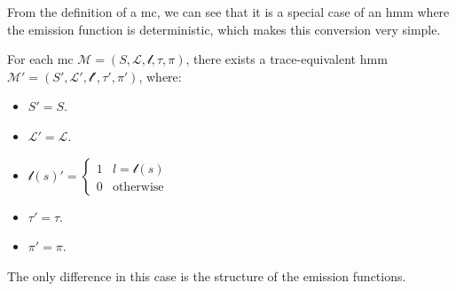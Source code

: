From the definition of a \gls{mc}, we can see that it is a special case of an \gls{hmm} where the emission function is deterministic, which makes this conversion very simple.


\begin{definition}
    For each \gls{mc} $\mathcal{M} = (S, \mathcal{L}, \mathscr{l}, \tau,  \pi)$, there exists a trace-equivalent \gls{hmm} $\mathcal{M}' = (S', \mathcal{L}', \mathscr{l}', \tau',  \pi')$, where:
    \begin{itemize}
        \item $S' = S$.
        \item $\mathcal{L}' = \mathcal{L}$.
        \item $\mathscr{l}(s)' =  \begin{cases}
                      1 & l=\mathscr{l}(s) \\
                      0 & \text{otherwise}
                  \end{cases}$
        \item $\tau' = \tau$.
        \item $\pi' = \pi$.
    \end{itemize}
\end{definition}


The only difference in this case is the structure of the emission functions.

